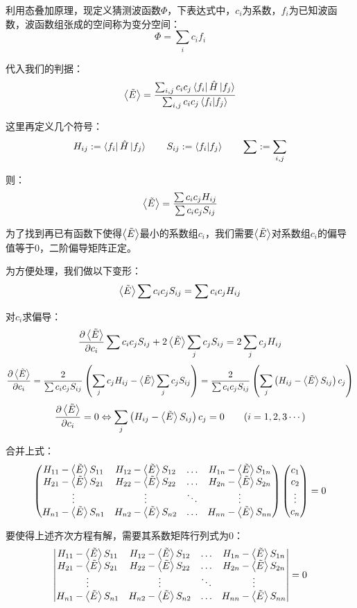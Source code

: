 利用态叠加原理，现定义猜测波函数$\varPhi$，下表达式中，$c_i$为系数，$f_i$为已知波函数，波函数组张成的空间称为变分空间：
\[\varPhi=\sum_ic_if_i\]

代入我们的判据：
\[\expval{\tilde{E}}=\frac{\sum_{i,j}c_ic_j\bra{f_i}\hat{H}\ket{f_j}}{\sum_{i,j}c_ic_j\bra{f_i}\ket{f_j}}\]

这里再定义几个符号：
\[H_{ij}:=\bra{f_i}\hat{H}\ket{f_j} \qquad S_{ij}:=\bra{f_i}\ket{f_j} \qquad \sum:=\sum_{i,j}\]

则：
\[\expval{\tilde{E}}=\frac{\sum c_ic_jH_{ij}}{\sum c_ic_jS_{ij}}\]

为了找到再已有函数下使得$\expval{\tilde{E}}$最小的系数组$c_i$，我们需要$\expval{\tilde{E}}$对系数组$c_i$的偏导值等于0，二阶偏导矩阵正定。

为方便处理，我们做以下变形：
\[\expval{\tilde{E}}\sum c_ic_jS_{ij}=\sum c_ic_jH_{ij}\]

对$c_i$求偏导：
\[\frac{\partial \expval{\tilde{E}}}{\partial c_i}\sum c_ic_jS_{ij}+2\expval{\tilde{E}}\sum_j c_jS_{ij}=2\sum_j c_jH_{ij}\]
\[\frac{\partial \expval{\tilde{E}}}{\partial c_i}=\frac{2}{\sum c_ic_jS_{ij}}\left(\sum_j c_jH_{ij}-\expval{\tilde{E}}\sum_j c_jS_{ij}\right)=\frac{2}{\sum c_ic_jS_{ij}}\left(\sum_j \left (H_{ij}-\expval{\tilde{E}}S_{ij}\right )c_j\right)\]
\[\frac{\partial \expval{\tilde{E}}}{\partial c_i}=0 \Leftrightarrow \sum_j \left (H_{ij}-\expval{\tilde{E}}S_{ij}\right )c_j=0 \qquad (i=1,2,3 \cdots)\]

合并上式：
\[
\begin{pmatrix}
H_{11}-\expval{\tilde{E}}S_{11} & H_{12}-\expval{\tilde{E}}S_{12} & \ldots & H_{1n}-\expval{\tilde{E}}S_{1n}\\
H_{21}-\expval{\tilde{E}}S_{21} & H_{22}-\expval{\tilde{E}}S_{22} & \ldots & H_{2n}-\expval{\tilde{E}}S_{2n}\\
\vdots & \vdots & \ddots & \vdots\\
H_{n1}-\expval{\tilde{E}}S_{n1} & H_{n2}-\expval{\tilde{E}}S_{n2} & \ldots & H_{nn}-\expval{\tilde{E}}S_{nn}\\
\end{pmatrix}
\begin{pmatrix}
c_1\\
c_2\\
\vdots\\
c_n\\
\end{pmatrix}
=0
\]

要使得上述齐次方程有解，需要其系数矩阵行列式为0：
\[
    \begin{vmatrix}
        H_{11}-\expval{\tilde{E}}S_{11} & H_{12}-\expval{\tilde{E}}S_{12} & \ldots & H_{1n}-\expval{\tilde{E}}S_{1n}\\
        H_{21}-\expval{\tilde{E}}S_{21} & H_{22}-\expval{\tilde{E}}S_{22} & \ldots & H_{2n}-\expval{\tilde{E}}S_{2n}\\
        \vdots & \vdots & \ddots & \vdots\\
        H_{n1}-\expval{\tilde{E}}S_{n1} & H_{n2}-\expval{\tilde{E}}S_{n2} & \ldots & H_{nn}-\expval{\tilde{E}}S_{nn}\\
    \end{vmatrix}
    =0
\]


